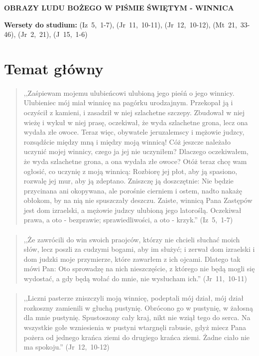 \documentclass[10pt,a4paper,oneside]{article}
\begin{document}
\centerline{\textbf{\MakeUppercase{Obrazy Ludu Bożego w Piśmie Świętym - winnica}}}
\begin{center}
\textbf{Wersety do studium:} \mbox{(Iz 5, 1-7)}, \mbox{(Jr 11, 10-11)}, \mbox{(Jr 12, 10-12)}, \mbox{(Mt 21, 33-46)}, \mbox{(Jr 2, 21)}, \mbox{(J 15, 1-6)}
\end{center}
\section{Temat główny}
\paragraph{}
\begin{quote}
,,Zaśpiewam mojemu ulubieńcowi ulubioną jego pieśń o jego winnicy. Ulubieniec mój miał winnicę na pagórku urodzajnym. Przekopał ją i oczyścił z kamieni, i zasadził w niej szlachetne szczepy. Zbudował w niej wieżę i wykuł w niej prasę, oczekiwał, że wyda szlachetne grona, lecz ona wydała złe owoce. Teraz więc, obywatele jeruzalemscy i mężowie judzcy, rozsądźcie między mną i między moją winnicą! Cóż jeszcze należało uczynić mojej winnicy, czego ja jej nie uczyniłem? Dlaczego oczekiwałem, że wyda szlachetne grona, a ona wydała złe owoce? Otóż teraz chcę wam ogłosić, co uczynię z moją winnicą: Rozbiorę jej płot, aby ją spasiono, rozwalę jej mur, aby ją zdeptano. Zniszczę ją doszczętnie: Nie będzie przycinana ani okopywana, ale porośnie cierniem i ostem, nadto nakażę obłokom, by na nią nie spuszczały deszczu. Zaiste, winnicą Pana Zastępów jest dom izraelski, a mężowie judzcy ulubioną jego latoroślą. Oczekiwał prawa, a oto - bezprawie; sprawiedliwości, a oto - krzyk.'' \mbox{(Iz 5, 1-7)}
\end{quote}
\paragraph{}
\begin{quote}
,,Że zawrócili do win swoich praojców, którzy nie chcieli słuchać moich słów, lecz poszli za cudzymi bogami, aby im służyć; i zerwał dom izraelski i dom judzki moje przymierze, które zawarłem z ich ojcami. Dlatego tak mówi Pan: Oto sprowadzę na nich nieszczęście, z którego nie będą mogli się wydostać, a gdy będą wołać do mnie, nie wysłucham ich.'' \mbox{(Jr 11, 10-11)}
\end{quote}
\paragraph{}
\begin{quote}
,,Liczni pasterze zniszczyli moją winnicę, podeptali mój dział, mój dział rozkoszny zamienili w głuchą pustynię. Obrócono go w pustynię, w żałosną dla mnie pustynię. Spustoszony cały kraj, nikt nie wziął tego do serca. Na wszystkie gołe wzniesienia w pustyni wtargnęli rabusie, gdyż miecz Pana pożera od jednego krańca ziemi do drugiego krańca ziemi. Żadne ciało nie ma spokoju.'' \mbox{(Jr 12, 10-12)}
\end{quote}
\end{document}
